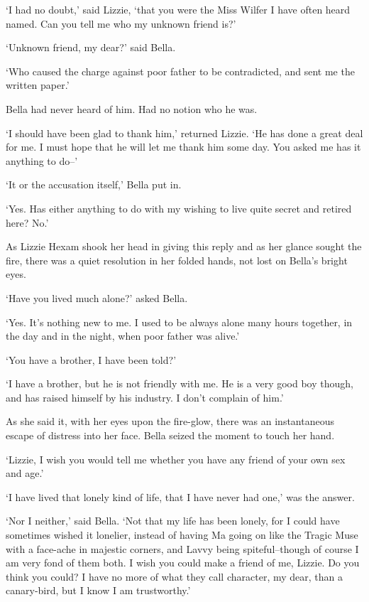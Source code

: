 ‘I had no doubt,’ said Lizzie, ‘that you were the Miss Wilfer I have
often heard named. Can you tell me who my unknown friend is?’

‘Unknown friend, my dear?’ said Bella.

‘Who caused the charge against poor father to be contradicted, and sent
me the written paper.’

Bella had never heard of him. Had no notion who he was.

‘I should have been glad to thank him,’ returned Lizzie. ‘He has done a
great deal for me. I must hope that he will let me thank him some day.
You asked me has it anything to do--’

‘It or the accusation itself,’ Bella put in.

‘Yes. Has either anything to do with my wishing to live quite secret and
retired here? No.’

As Lizzie Hexam shook her head in giving this reply and as her glance
sought the fire, there was a quiet resolution in her folded hands, not
lost on Bella’s bright eyes.

‘Have you lived much alone?’ asked Bella.

‘Yes. It’s nothing new to me. I used to be always alone many hours
together, in the day and in the night, when poor father was alive.’

‘You have a brother, I have been told?’

‘I have a brother, but he is not friendly with me. He is a very good
boy though, and has raised himself by his industry. I don’t complain of
him.’

As she said it, with her eyes upon the fire-glow, there was an
instantaneous escape of distress into her face. Bella seized the moment
to touch her hand.

‘Lizzie, I wish you would tell me whether you have any friend of your
own sex and age.’

‘I have lived that lonely kind of life, that I have never had one,’ was
the answer.

‘Nor I neither,’ said Bella. ‘Not that my life has been lonely, for I
could have sometimes wished it lonelier, instead of having Ma going on
like the Tragic Muse with a face-ache in majestic corners, and Lavvy
being spiteful--though of course I am very fond of them both. I wish
you could make a friend of me, Lizzie. Do you think you could? I have
no more of what they call character, my dear, than a canary-bird, but I
know I am trustworthy.’

